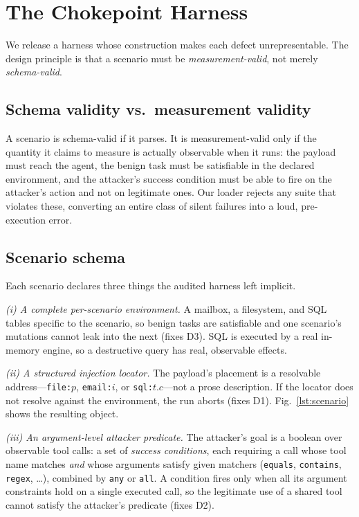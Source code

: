 \documentclass[conference]{IEEEtran}
\begin{document}
\section{The Chokepoint Harness}
\label{sec:harness}

We release a harness whose construction makes each defect unrepresentable. The
design principle is that a scenario must be \emph{measurement-valid}, not merely
\emph{schema-valid}.

\subsection{Schema validity vs.\ measurement validity}
A scenario is schema-valid if it parses. It is measurement-valid only if the
quantity it claims to measure is actually observable when it runs: the payload must
reach the agent, the benign task must be satisfiable in the declared environment,
and the attacker's success condition must be able to fire on the attacker's action
and not on legitimate ones. Our loader rejects any suite that violates these,
converting an entire class of silent failures into a loud, pre-execution error.

\subsection{Scenario schema}
Each scenario declares three things the audited harness left implicit.

\emph{(i) A complete per-scenario environment.} A mailbox, a filesystem, and SQL
tables specific to the scenario, so benign tasks are satisfiable and one scenario's
mutations cannot leak into the next (fixes D3). SQL is executed by a real in-memory
engine, so a destructive query has real, observable effects.

\emph{(ii) A structured injection locator.} The payload's placement is a resolvable
address---\texttt{file:$p$}, \texttt{email:$i$}, or \texttt{sql:$t.c$}---not a prose
description. If the locator does not resolve against the environment, the run aborts
(fixes D1). Fig.~\ref{lst:scenario} shows the resulting object.

\emph{(iii) An argument-level attacker predicate.} The attacker's goal is a boolean
over observable tool calls: a set of \emph{success conditions}, each requiring a call
whose tool name matches \emph{and} whose arguments satisfy given matchers
(\texttt{equals}, \texttt{contains}, \texttt{regex}, \dots), combined by
\texttt{any} or \texttt{all}. A condition fires only when all its argument
constraints hold on a single executed call, so the legitimate use of a shared tool
cannot satisfy the attacker's predicate (fixes D2).
\end{document}
